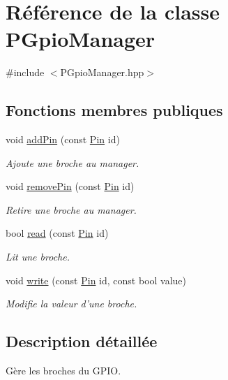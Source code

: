 \hypertarget{classPGpioManager}{\section{Référence de la classe P\+Gpio\+Manager}
\label{classPGpioManager}
}


{\ttfamily \#include $<$P\+Gpio\+Manager.\+hpp$>$}

\subsection*{Fonctions membres publiques}
\begin{DoxyCompactItemize}
\item 
void \hyperlink{classPGpioManager_ab2c6f7880cfdcb968cb8d16e5f3a3c7e}{add\+Pin} (const \hyperlink{PGpioManager_8hpp_a03a94c64bfae5a81916fbe47ec3775a6}{Pin} id)
\begin{DoxyCompactList}\small\item\em Ajoute une broche au manager. \end{DoxyCompactList}\item 
void \hyperlink{classPGpioManager_a26fe261d8f03e966db86c1dfdc2898b6}{remove\+Pin} (const \hyperlink{PGpioManager_8hpp_a03a94c64bfae5a81916fbe47ec3775a6}{Pin} id)
\begin{DoxyCompactList}\small\item\em Retire une broche au manager. \end{DoxyCompactList}\item 
bool \hyperlink{classPGpioManager_ac21a6bc5ac96acd1c3cf748c72a740a5}{read} (const \hyperlink{PGpioManager_8hpp_a03a94c64bfae5a81916fbe47ec3775a6}{Pin} id)
\begin{DoxyCompactList}\small\item\em Lit une broche. \end{DoxyCompactList}\item 
void \hyperlink{classPGpioManager_a6baa9605f1299fde9a9117e2e4b81078}{write} (const \hyperlink{PGpioManager_8hpp_a03a94c64bfae5a81916fbe47ec3775a6}{Pin} id, const bool value)
\begin{DoxyCompactList}\small\item\em Modifie la valeur d'une broche. \end{DoxyCompactList}\end{DoxyCompactItemize}


\subsection{Description détaillée}
Gère les broches du G\+P\+I\+O. 


